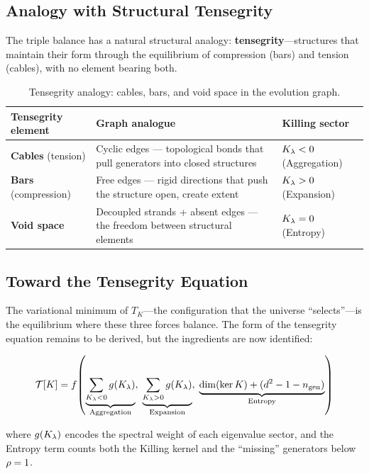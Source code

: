 \subsection{Analogy with Structural Tensegrity}\label{sec:tensegrity_analogy}

The triple balance has a natural structural analogy: \textbf{tensegrity}---structures that maintain their form through the equilibrium of compression (bars) and tension (cables), with no element bearing both.

\begin{table}[h]
\fontsize{7pt}{10pt}\selectfont
\centering
\begin{tabular}{l l l}
\hline\hline
Tensegrity element & Graph analogue & Killing sector \\
\hline
\textbf{Cables} (tension) & Cyclic edges --- topological bonds that pull generators into closed structures & $K_\lambda < 0$ (Aggregation) \\
\textbf{Bars} (compression) & Free edges --- rigid directions that push the structure open, create extent & $K_\lambda > 0$ (Expansion) \\
\textbf{Void space} & Decoupled strands + absent edges --- the freedom between structural elements & $K_\lambda = 0$ (Entropy) \\
\hline\hline
\end{tabular}
\caption{Tensegrity analogy: cables, bars, and void space in the evolution graph.}
\end{table}

\subsection{Toward the Tensegrity Equation}\label{sec:tensegrity_equation}

The variational minimum of $T_K$---the configuration that the universe ``selects''---is the equilibrium where these three forces balance. The form of the tensegrity equation remains to be derived, but the ingredients are now identified:

\begin{equation}
\mathcal{T}[K] = f\!\left(\underbrace{\sum_{K_\lambda < 0} g(K_\lambda)}_{\text{Aggregation}}, \; \underbrace{\sum_{K_\lambda > 0} g(K_\lambda)}_{\text{Expansion}}, \; \underbrace{\dim(\ker K) + (d^2 - 1 - n_{\mathrm{gen}})}_{\text{Entropy}}\right)
\end{equation}

where $g(K_\lambda)$ encodes the spectral weight of each eigenvalue sector, and the Entropy term counts both the Killing kernel and the ``missing'' generators below $\rho = 1$.
